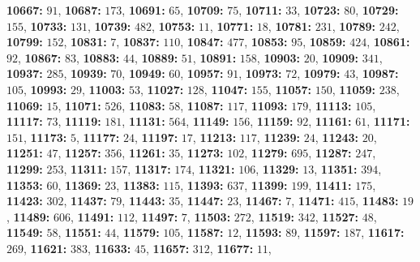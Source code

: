 \textsf{\bfseries 10667:} $91$, \textsf{\bfseries 10687:} $173$, \textsf{\bfseries 10691:} $65$, \textsf{\bfseries 10709:} $75$, \textsf{\bfseries 10711:} $33$, \textsf{\bfseries 10723:} $80$, \textsf{\bfseries 10729:} $155$, \textsf{\bfseries 10733:} $131$, \textsf{\bfseries 10739:} $482$, \textsf{\bfseries 10753:} $11$, \textsf{\bfseries 10771:} $18$, \textsf{\bfseries 10781:} $231$, \textsf{\bfseries 10789:} $242$, \textsf{\bfseries 10799:} $152$, \textsf{\bfseries 10831:} $7$, \textsf{\bfseries 10837:} $110$, \textsf{\bfseries 10847:} $477$, \textsf{\bfseries 10853:} $95$, \textsf{\bfseries 10859:} $424$, \textsf{\bfseries 10861:} $92$, \textsf{\bfseries 10867:} $83$, \textsf{\bfseries 10883:} $44$, \textsf{\bfseries 10889:} $51$, \textsf{\bfseries 10891:} $158$, \textsf{\bfseries 10903:} $20$, \textsf{\bfseries 10909:} $341$, \textsf{\bfseries 10937:} $285$, \textsf{\bfseries 10939:} $70$, \textsf{\bfseries 10949:} $60$, \textsf{\bfseries 10957:} $91$, \textsf{\bfseries 10973:} $72$, \textsf{\bfseries 10979:} $43$, \textsf{\bfseries 10987:} $105$, \textsf{\bfseries 10993:} $29$, \textsf{\bfseries 11003:} $53$, \textsf{\bfseries 11027:} $128$, \textsf{\bfseries 11047:} $155$, \textsf{\bfseries 11057:} $150$, \textsf{\bfseries 11059:} $238$, \textsf{\bfseries 11069:} $15$, \textsf{\bfseries 11071:} $526$, \textsf{\bfseries 11083:} $58$, \textsf{\bfseries 11087:} $117$, \textsf{\bfseries 11093:} $179$, \textsf{\bfseries 11113:} $105$, \textsf{\bfseries 11117:} $73$, \textsf{\bfseries 11119:} $181$, \textsf{\bfseries 11131:} $564$, \textsf{\bfseries 11149:} $156$, \textsf{\bfseries 11159:} $92$, \textsf{\bfseries 11161:} $61$, \textsf{\bfseries 11171:} $151$, \textsf{\bfseries 11173:} $5$, \textsf{\bfseries 11177:} $24$, \textsf{\bfseries 11197:} $17$, \textsf{\bfseries 11213:} $117$, \textsf{\bfseries 11239:} $24$, \textsf{\bfseries 11243:} $20$, \textsf{\bfseries 11251:} $47$, \textsf{\bfseries 11257:} $356$, \textsf{\bfseries 11261:} $35$, \textsf{\bfseries 11273:} $102$, \textsf{\bfseries 11279:} $695$, \textsf{\bfseries 11287:} $247$, \textsf{\bfseries 11299:} $253$, \textsf{\bfseries 11311:} $157$, \textsf{\bfseries 11317:} $174$, \textsf{\bfseries 11321:} $106$, \textsf{\bfseries 11329:} $13$, \textsf{\bfseries 11351:} $394$, \textsf{\bfseries 11353:} $60$, \textsf{\bfseries 11369:} $23$, \textsf{\bfseries 11383:} $115$, \textsf{\bfseries 11393:} $637$, \textsf{\bfseries 11399:} $199$, \textsf{\bfseries 11411:} $175$, \textsf{\bfseries 11423:} $302$, \textsf{\bfseries 11437:} $79$, \textsf{\bfseries 11443:} $35$, \textsf{\bfseries 11447:} $23$, \textsf{\bfseries 11467:} $7$, \textsf{\bfseries 11471:} $415$, \textsf{\bfseries 11483:} $19$, \textsf{\bfseries 11489:} $606$, \textsf{\bfseries 11491:} $112$, \textsf{\bfseries 11497:} $7$, \textsf{\bfseries 11503:} $272$, \textsf{\bfseries 11519:} $342$, \textsf{\bfseries 11527:} $48$, \textsf{\bfseries 11549:} $58$, \textsf{\bfseries 11551:} $44$, \textsf{\bfseries 11579:} $105$, \textsf{\bfseries 11587:} $12$, \textsf{\bfseries 11593:} $89$, \textsf{\bfseries 11597:} $187$, \textsf{\bfseries 11617:} $269$, \textsf{\bfseries 11621:} $383$, \textsf{\bfseries 11633:} $45$, \textsf{\bfseries 11657:} $312$, \textsf{\bfseries 11677:} $11$, 
